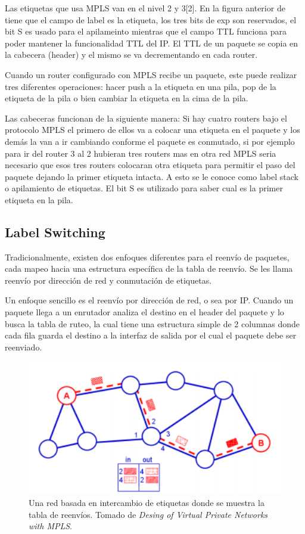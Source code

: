 \documentclass[10pt,journal,compsoc]{IEEEtran}
\begin{document}
Las etiquetas que usa MPLS van en el nivel 2 y 3[2]. En la figura anterior de tiene que el campo de label es la etiqueta, los tres bits de exp son reservados, el bit S es usado para el apilameinto mientras que el campo TTL funciona para poder mantener la funcionalidad TTL del IP. El TTL de un paquete se copia en la cabecera (header) y el mismo se va decrementando en cada router.

Cuando un router configurado con MPLS recibe un paquete, este puede realizar tres diferentes operaciones: hacer push a la etiqueta en una pila, pop de la etiqueta de la pila o bien cambiar la etiqueta en la cima de la pila.  

Las cabeceras funcionan de la siguiente manera: Si hay cuatro routers bajo el protocolo MPLS el primero de ellos va a colocar una etiqueta en el paquete y los demás la van a ir cambiando conforme el paquete es conmutado, si por ejemplo para ir del router 3 al 2 hubieran tres routers mas en otra red MPLS seria necesario que esos tres routers colocaran otra etiqueta para permitir el paso del paquete dejando la primer etiqueta intacta. A esto se le conoce como label stack o apilamiento de etiquetas. El bit S es utilizado para saber cual es la primer etiqueta en la pila.


\subsection{Label Switching}

Tradicionalmente, existen dos enfoques diferentes para el reenvío de paquetes, cada mapeo hacia una estructura específica de la tabla de reenvío. Se les llama reenvío por dirección de red y conmutación de etiquetas.


Un enfoque sencillo es el reenvío por dirección de red, o sea por IP. Cuando un paquete llega a un enrutador analiza el destino en el header del paquete y lo busca la tabla de ruteo, la cual tiene una estructura simple de 2 columnas donde cada fila guarda el destino a la interfaz de salida por el cual el paquete debe ser reenviado. 

\begin{figure}[h]
    \center
    \includegraphics[width=15cm]{label-fowarding}
    \caption{Una red basada en intercambio de etiquetas donde se muestra la tabla de reenvíos. Tomado de  \emph{Desing of Virtual Private Networks with MPLS}\cite{rexford}.}
    \label{fig:tradicitional-architecture}
\end{figure}
\end{document}
